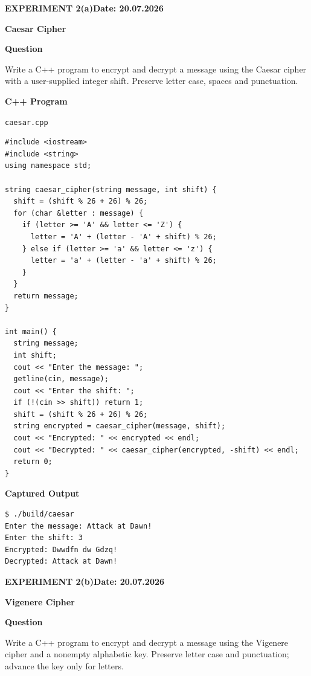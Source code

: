 \documentclass[11pt,a4paper]{article}
\newcommand{\blocktitle}[1]{\Needspace{6\baselineskip}\par\textbf{#1}\par}
\begin{document}
\clearpage
{}\label{exp:caesar}
{\small\bfseries EXPERIMENT 2(a)\hfill Date: 20.07.2026\par}
{\Large\bfseries Caesar Cipher\par}
\vspace{2mm}
\blocktitle{Question}
Write a C++ program to encrypt and decrypt a message using the Caesar cipher with a user-supplied integer shift. Preserve letter case, spaces and punctuation.

\blocktitle{C++ Program}
{\small\texttt{caesar.cpp}\par}
\begin{lstlisting}[style=cpp]
#include <iostream>
#include <string>
using namespace std;

string caesar_cipher(string message, int shift) {
  shift = (shift % 26 + 26) % 26;
  for (char &letter : message) {
    if (letter >= 'A' && letter <= 'Z') {
      letter = 'A' + (letter - 'A' + shift) % 26;
    } else if (letter >= 'a' && letter <= 'z') {
      letter = 'a' + (letter - 'a' + shift) % 26;
    }
  }
  return message;
}

int main() {
  string message;
  int shift;
  cout << "Enter the message: ";
  getline(cin, message);
  cout << "Enter the shift: ";
  if (!(cin >> shift)) return 1;
  shift = (shift % 26 + 26) % 26;
  string encrypted = caesar_cipher(message, shift);
  cout << "Encrypted: " << encrypted << endl;
  cout << "Decrypted: " << caesar_cipher(encrypted, -shift) << endl;
  return 0;
}
\end{lstlisting}
\par\begin{minipage}{\linewidth}
\textbf{Captured Output}\par
\begin{lstlisting}[style=terminal]
$ ./build/caesar
Enter the message: Attack at Dawn!
Enter the shift: 3
Encrypted: Dwwdfn dw Gdzq!
Decrypted: Attack at Dawn!
\end{lstlisting}
\end{minipage}

\clearpage
{}\label{exp:vigenere}
{\small\bfseries EXPERIMENT 2(b)\hfill Date: 20.07.2026\par}
{\Large\bfseries Vigenere Cipher\par}
\vspace{2mm}
\blocktitle{Question}
Write a C++ program to encrypt and decrypt a message using the Vigenere cipher and a nonempty alphabetic key. Preserve letter case and punctuation; advance the key only for letters.
\end{document}

